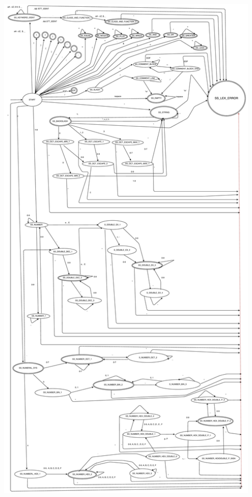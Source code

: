\documentclass[12pt, a4paper]{article}
\begin{document}
            \begin{center}
            \includegraphics[width=\paperwidth,height=\textheight,keepaspectratio]{ka_scanner_diagram.pdf}
            \end{center}
            
\end{document}
